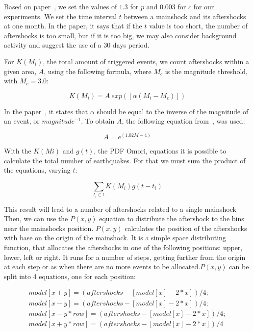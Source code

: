 Based on paper~\cite{yamanaka1990scaling}, we set the values of $1.3$ for $p$ and $0.003$ for $c$ for our experiments. We set the time interval $t$ between a mainshock and its aftershocks at one month. In the paper, it says that if the $t$ value is too short, the number of aftershocks is too small, but if it is too big, we may also consider background activity and suggest the use of a 30 days period.

For $K(M_i)$, the total amount of triggered events, we count aftershocks within a given area, $A$, using the following formula, where $M_c$ is the magnitude threshold, with $M_c=3.0$:

\begin{equation}\label{triggered}
 K(M_i) = A\ exp([\alpha(M_i-M_c)])
\end{equation}

In the paper~\cite{ogata2006space}, it states that $\alpha$ should be equal to the inverse of the magnitude of an event, or $magnitude^{-1}$. To obtain $A$, the following equation from~\cite{yamanaka1990scaling}, was used:

\begin{equation}
A = e^{(1.02M -4)}
\end{equation}

With the $K(Mi)$ and $g(t)$, the PDF Omori, equations it is possible to calculate the total number of earthquakes. For that we must sum the product of the equations, varying $t$:

\begin{equation}
\displaystyle\sum_{t_i \in t} K(M_i)g(t-t_i)
\end{equation}

This result will lead to a number of aftershocks related to a single mainshock Then, we can use the $P(x,y)$ equation to distribute the aftershock to the bins near the mainshocks position.  $P(x,y)$ calculates the position of the aftershocks with base on the origin of the mainshock. It is a simple space distributing function, that allocates the aftershocks in one of the following positions: upper, lower, left or right. It runs for a number of steps, getting further from the origin at each step or as when there are no more events to be allocated.$P(x,y)$ can be split into 4 equations, one for each position:

\begin{subequations}
\begin{gather*}
        model[x+y] = (aftershocks-[model[x]-2*x])/4;\\
        model[x-y] = (aftershocks-[model[x]-2*x])/4;\\
        model[x-y*row] = (aftershocks-[model[x]-2*x])/4;\\
        model[x+y*row] = (aftershocks-[model[x]-2*x])/4
\end{gather*}
\end{subequations}


